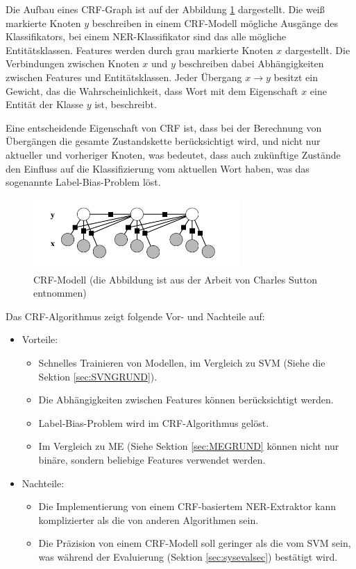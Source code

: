 Die Aufbau eines CRF-Graph ist auf der Abbildung \ref{fig:CRF-Modell} dargestellt. Die weiß markierte Knoten $y$ beschreiben in einem CRF-Modell mögliche Ausgänge des Klassifikators, bei einem NER-Klassifikator sind das alle mögliche Entitätsklassen. Features werden durch grau markierte Knoten $x$ dargestellt. Die Verbindungen zwischen Knoten $x$ und $y$ beschreiben dabei Abhängigkeiten zwischen Features und Entitätsklassen. Jeder Übergang $x \longrightarrow y$ besitzt ein Gewicht, das die Wahrscheinlichkeit, dass Wort mit dem Eigenschaft $x$ eine Entität der Klasse $y$ ist, beschreibt.

Eine entscheidende Eigenschaft von CRF ist, dass bei der Berechnung von Übergängen die gesamte Zustandskette berücksichtigt wird, und nicht nur aktueller und vorheriger Knoten\cite{rossler2007korpus}, was bedeutet, dass auch zukünftige Zustände den Einfluss auf die Klassifizierung vom aktuellen Wort haben, was das sogenannte Label-Bias-Problem\cite{lafferty2001conditional} löst.

\begin{figure}[ht]
\vbox{\small}
\includegraphics[width=0.7\textwidth]{Bilder/crf-modell-charles-andrew}
\caption{CRF-Modell (die Abbildung ist aus der Arbeit von Charles Sutton \cite{Charles/Andrew:10} entnommen)}
\label{fig:CRF-Modell}
\end{figure}

Das CRF-Algorithmus zeigt folgende Vor- und Nachteile auf:
\begin{itemize}
\item Vorteile:
\begin{itemize}
\item Schnelles Trainieren von Modellen\cite{sha2003shallow}, im Vergleich zu SVM (Siehe die Sektion \ref{sec:SVNGRUND}).
\item Die Abhängigkeiten zwischen Features können berücksichtigt werden.
\item Label-Bias-Problem wird im CRF-Algorithmus gelöst.
\item Im Vergleich zu ME (Siehe Sektion \ref{sec:MEGRUND} können nicht nur binäre, sondern beliebige Features verwendet werden.
\end{itemize}
\item Nachteile:
\begin{itemize}
\item Die Implementierung von einem CRF-basiertem NER-Extraktor kann komplizierter als die von anderen Algorithmen sein.
\item Die Präzision von einem CRF-Modell soll geringer als die vom SVM sein, was während der Evaluierung (Sektion \ref{sec:sysevalsec}) bestätigt wird.
\end{itemize}
\end{itemize}

